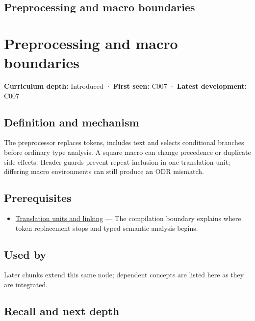 \hypertarget{appendix-33c0a92ce855}{}
\section*{Preprocessing and macro boundaries}
\chapter{Preprocessing and macro boundaries}\label{appendix-33c0a92ce855-preprocessing-and-macro-boundaries}

\textbf{Curriculum depth:} Introduced · \textbf{First seen:} C007 · \textbf{Latest development:} C007

\section{Definition and mechanism}\label{appendix-33c0a92ce855-definition-and-mechanism}

The preprocessor replaces tokens, includes text and selects conditional branches before ordinary type analysis. A square macro can change precedence or duplicate side effects. Header guards prevent repeat inclusion in one translation unit; differing macro environments can still produce an ODR mismatch.

\section{Prerequisites}\label{appendix-33c0a92ce855-prerequisites}

\begin{itemize}
\tightlist
\item
  \hyperref[appendix-806686359e1b]{Translation units and linking} --- The compilation boundary explains where token replacement stops and typed semantic analysis begins.
\end{itemize}

\section{Used by}\label{appendix-33c0a92ce855-used-by}

Later chunks extend this same node; dependent concepts are listed here as they are integrated.

\section{Recall and next depth}\label{appendix-33c0a92ce855-recall-and-next-depth}

